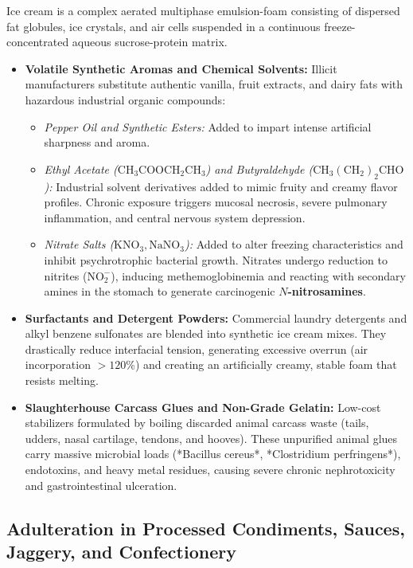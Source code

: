 \documentclass[11pt,a4paper,oneside]{article}
\begin{document}
Ice cream is a complex aerated multiphase emulsion-foam consisting of dispersed fat globules, ice crystals, and air cells suspended in a continuous freeze-concentrated aqueous sucrose-protein matrix.

\begin{itemize}[leftmargin=*]
    \item \textbf{Volatile Synthetic Aromas and Chemical Solvents:} Illicit manufacturers substitute authentic vanilla, fruit extracts, and dairy fats with hazardous industrial organic compounds:
    \begin{itemize}
        \item \textit{Pepper Oil and Synthetic Esters:} Added to impart intense artificial sharpness and aroma.
        \item \textit{Ethyl Acetate ($\mathrm{CH_3COOCH_2CH_3}$) and Butyraldehyde ($\mathrm{CH_3(CH_2)_2CHO}$):} Industrial solvent derivatives added to mimic fruity and creamy flavor profiles. Chronic exposure triggers mucosal necrosis, severe pulmonary inflammation, and central nervous system depression.
        \item \textit{Nitrate Salts ($\mathrm{KNO_3, NaNO_3}$):} Added to alter freezing characteristics and inhibit psychrotrophic bacterial growth. Nitrates undergo reduction to nitrites ($\mathrm{NO_2^-}$), inducing methemoglobinemia and reacting with secondary amines in the stomach to generate carcinogenic \textbf{$N$-nitrosamines}.
    \end{itemize}
    \item \textbf{Surfactants and Detergent Powders:} Commercial laundry detergents and alkyl benzene sulfonates are blended into synthetic ice cream mixes. They drastically reduce interfacial tension, generating excessive overrun (air incorporation $>120\%$) and creating an artificially creamy, stable foam that resists melting.
    \item \textbf{Slaughterhouse Carcass Glues and Non-Grade Gelatin:} Low-cost stabilizers formulated by boiling discarded animal carcass waste (tails, udders, nasal cartilage, tendons, and hooves). These unpurified animal glues carry massive microbial loads (*Bacillus cereus*, *Clostridium perfringens*), endotoxins, and heavy metal residues, causing severe chronic nephrotoxicity and gastrointestinal ulceration.
\end{itemize}

\subsection{Adulteration in Processed Condiments, Sauces, Jaggery, and Confectionery}
\end{document}

